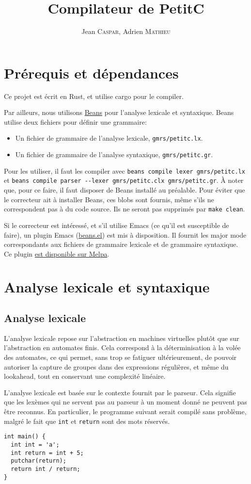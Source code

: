 \documentclass{scrartcl}
\title{Compilateur de PetitC}
\author{%
  Jean \textsc{Caspar},
  Adrien \textsc{Mathieu}
}
\date{}
\begin{document}
\maketitle{}

\section*{Prérequis et dépendances}
Ce projet est écrit en Rust, et utilise cargo pour le compiler.\par
Par ailleurs, nous utilisons \href{https://github.com/jthulhu/beans}{Beans}
pour l'analyse lexicale et syntaxique. Beans utilise deux fichiers pour définir
une grammaire:
\begin{itemize}
\item Un fichier de grammaire de l'analyse lexicale, \verb|gmrs/petitc.lx|.
\item Un fichier de grammaire de l'analyse syntaxique, \verb|gmrs/petitc.gr|.
\end{itemize}
Pour les utiliser, il faut les compiler avec \verb|beans compile lexer gmrs/petitc.lx|
et \verb|beans compile parser --lexer gmrs/petitc.clx gmrs/petitc.gr|. À noter
que, pour ce faire, il faut disposer de Beans installé au préalable. Pour éviter
que le correcteur ait à installer Beans, ces blobs sont fournis, même s'ils
ne correspondent pas à du code source. Ils ne seront pas supprimés par
\verb|make clean|.\par
Si le correcteur est intéressé, et s'il utilise Emacs (ce qu'il est susceptible
de faire), un plugin Emacs (\href{https://github.com/jthulhu/emacs-beans}{beans.el})
est mis à disposition. Il fournit les major mode correspondants aux fichiers
de grammaire lexicale et de grammaire syntaxique. Ce plugin
\href{https://melpa.org/#/beans}{est disponible sur Melpa}.

\section*{Analyse lexicale et syntaxique}
\subsection*{Analyse lexicale}
L'analyse lexicale repose sur l'abstraction en machines virtuelles plutôt que sur
l'abstraction en automates finis. Cela correspond à la déterminisation à la volée
des automates, ce qui permet, sans trop se fatiguer ultérieurement, de pouvoir
autoriser la capture de groupes dans des expressions régulières, et même du
lookahead, tout en conservant une complexité linéaire.\par
L'analyse lexicale est basée sur le contexte fournit par le parseur. Cela
signifie que les lexèmes qui ne servent pas au parseur à un moment donné ne
peuvent pas être reconnus. En particulier, le programme suivant serait compilé
sans problème, malgré le fait que \verb|int| et \verb|return| sont des mots
réservés.
\begin{verbatim}
int main() {
  int int = 'a';
  int return = int + 5;
  putchar(return);
  return int / return;
}
\end{verbatim}
\end{document}
